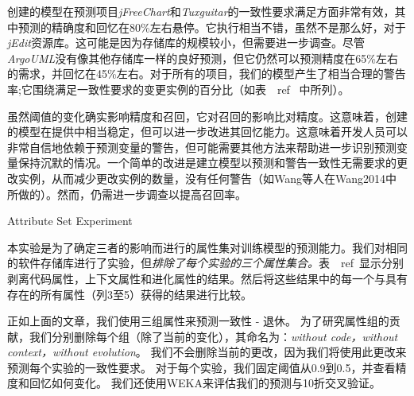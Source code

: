 {创建的模型在预测项目{\em jFreeChart}和{\em Tuxguitar}的一致性要求满足方面非常有效，其中预测的精确度和回忆在80\%左右悬停。它执行相当不错，虽然不是那么好，对于{\em jEdit}资源库。这可能是因为存储库的规模较小，但需要进一步调查。尽管{\em  ArgoUML}没有像其他存储库一样的良好预测，但它仍然可以预测精度在65\%左右的需求，并回忆在45\%左右。对于所有的项目，我们的模型产生了相当合理的警告率;它围绕满足一致性要求的变更实例的百分比（如表~\ ref {}~中所列）。

虽然阈值的变化确实影响精度和召回，它对召回的影响比对精度。这意味着，创建的模型在提供中相当稳定，但可以进一步改进其回忆能力。这意味着开发人员可以非常自信地依赖于预测变量的警告，但可能需要其他方法来帮助进一步识别预测变量保持沉默的情况。一个简单的改进是建立模型以预测和警告一致性无需要求的更改实例，从而减少更改实例的数量，没有任何警告（如Wang等人在\cite{}{Wang2014}中所做的）。然而，仍需进一步调查以提高召回率。

{Attribute Set Experiment}

本实验是为了确定三者的影响而进行的属性集对训练模型的预测能力。我们对相同的软件存储库进行了实验，但{\em 排除了每个实验的三个属性集合。}表~\ ref{}~显示分别剥离代码属性，上下文属性和进化属性的结果。然后将这些结果中的每一个与具有存在的所有属性（列3至5）获得的结果进行比较。

正如上面的文章，我们使用{三组属性}来预测一致性 - 退休。 为了研究属性组的贡献，我们分别删除每个组（除了当前的变化），其命名为：{\em without code，without context，without evolution}。 我们不会删除当前的更改，因为我们将使用此更改来预测每个实验的一致性要求。 对于每个实验，我们固定阈值从0.9到0.5，并查看精度和回忆如何变化。 我们还使用WEKA来评估我们的预测与10折交叉验证。

}
